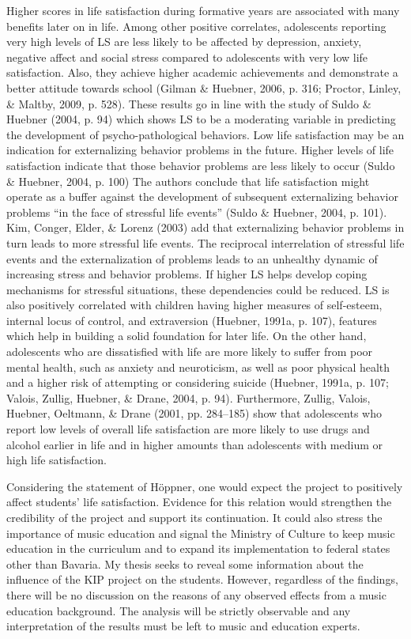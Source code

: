 \documentclass[a4, 12pt]{article}
\begin{document}
Higher scores in life satisfaction during formative years are associated with many benefits later on in life. Among other positive correlates, adolescents reporting very high levels of LS are less likely to be affected by depression, anxiety, negative affect and social stress compared to adolescents with very low life satisfaction. Also, they achieve higher academic achievements and demonstrate a better attitude towards school (Gilman \& Huebner, 2006, p. 316; Proctor, Linley, \& Maltby, 2009, p. 528). These results go in line with the study of Suldo \& Huebner (2004, p. 94) which shows LS to be a moderating variable in predicting the development of psycho-pathological behaviors. Low life satisfaction may be an indication for externalizing behavior problems in the future. Higher levels of life satisfaction indicate that those behavior problems are less likely to occur (Suldo \& Huebner, 2004, p. 100) The authors conclude that life satisfaction might operate as a buffer against the development of subsequent externalizing behavior problems ``in the face of stressful life events'' (Suldo \& Huebner, 2004, p. 101). Kim, Conger, Elder, \& Lorenz (2003) add that externalizing behavior problems in turn leads to more stressful life events. The reciprocal interrelation of stressful life events and the externalization of problems leads to an unhealthy dynamic of increasing stress and behavior problems. If higher LS helps develop coping mechanisms for stressful situations, these dependencies could be reduced.
LS is also positively correlated with children having higher measures of self-esteem, internal locus of control, and extraversion (Huebner, 1991a, p. 107), features which help in building a solid foundation for later life. On the other hand, adolescents who are dissatisfied with life are more likely to suffer from poor mental health, such as anxiety and neuroticism, as well as poor physical health and a higher risk of attempting or considering suicide (Huebner, 1991a, p. 107; Valois, Zullig, Huebner, \& Drane, 2004, p. 94). Furthermore, Zullig, Valois, Huebner, Oeltmann, \& Drane (2001, pp. 284--185) show that adolescents who report low levels of overall life satisfaction are more likely to use drugs and alcohol earlier in life and in higher amounts than adolescents with medium or high life satisfaction.

Considering the statement of Höppner, one would expect the project to positively affect students' life satisfaction. Evidence for this relation would strengthen the credibility of the project and support its continuation. It could also stress the importance of music education and signal the Ministry of Culture to keep music education in the curriculum and to expand its implementation to federal states other than Bavaria. My thesis seeks to reveal some information about the influence of the KIP project on the students. However, regardless of the findings, there will be no discussion on the reasons of any observed effects from a music education background. The analysis will be strictly observable and any interpretation of the results must be left to music and education experts.
\end{document}
